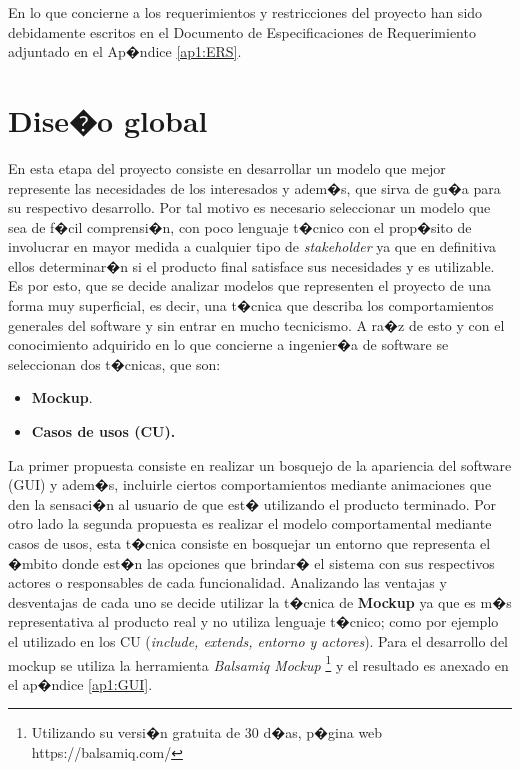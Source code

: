 En lo que concierne a los requerimientos y restricciones del proyecto han sido debidamente escritos en el Documento de Especificaciones de Requerimiento adjuntado en el Ap�ndice \ref{ap1:ERS}. 





\section{Dise�o global}
\label{cap1:sec:dise}

En esta etapa del proyecto consiste en desarrollar un modelo que mejor represente las necesidades de los interesados y adem�s, que sirva de gu�a para su respectivo desarrollo. Por tal motivo es necesario seleccionar un modelo que sea de f�cil comprensi�n, con poco lenguaje t�cnico con el prop�sito de involucrar en mayor medida a cualquier tipo de \textit{stakeholder} ya que en definitiva ellos determinar�n si el producto final satisface sus necesidades y es utilizable. Es por esto, que se decide analizar modelos que representen el proyecto de una forma muy superficial, es decir, una t�cnica que describa los comportamientos generales del software y  sin entrar en mucho tecnicismo. A ra�z de esto y con el conocimiento adquirido en lo que concierne a ingenier�a de software se seleccionan dos t�cnicas, que son:

\begin{itemize}
	\item \textbf{Mockup}.
	\item \textbf{Casos de usos (CU).}
\end{itemize}

La primer propuesta consiste en realizar un bosquejo de la apariencia del software (GUI) y adem�s, incluirle ciertos comportamientos mediante animaciones que den la sensaci�n al usuario de que est� utilizando el producto terminado. Por otro lado la segunda propuesta es realizar el modelo comportamental mediante casos de usos, esta t�cnica consiste en bosquejar un entorno que representa el �mbito donde est�n las opciones que brindar� el sistema con sus respectivos actores o responsables de cada funcionalidad. Analizando las ventajas y desventajas de cada uno se decide utilizar la t�cnica de \textbf{Mockup} ya que es m�s representativa al producto real y no utiliza lenguaje t�cnico; como por ejemplo el utilizado en los CU (\textit{include, extends, entorno y actores}). Para el desarrollo del mockup se utiliza la herramienta \textit{Balsamiq Mockup} \footnote{Utilizando su versi�n gratuita de 30 d�as, p�gina web https://balsamiq.com/} y el resultado es anexado en  el ap�ndice \ref{ap1:GUI}.

